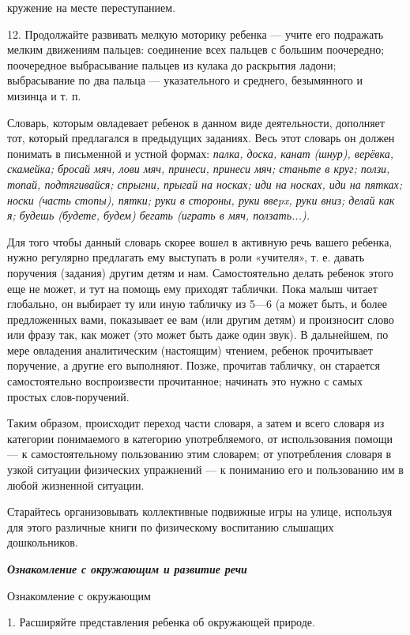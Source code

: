 \documentclass{book}
\renewcommand{\emph}[1]{\textit{#1}}
\begin{document}
кружение на месте переступанием.

12. Продолжайте развивать мелкую моторику ребенка --- учите его
подражать мелким движениям пальцев: соединение всех пальцев с большим
поочередно; поочередное выбрасывание пальцев из кулака до раскрытия
ладони; выбрасывание по два пальца --- указательного и среднего,
безымянного и мизинца и т. п.

Словарь, которым овладевает ребенок в данном виде деятельности,
дополняет тот, который предлагался в предыдущих заданиях. Весь этот
словарь он должен понимать в письменной и устной формах: \emph{палка,
доска, канат (шнур), верёвка, скамейка; бросай мяч, лови мяч, принеси,
принеси мяч; станьте в круг; ползи, топай, подтягивайся; спрыгни, прыгай
на носках; иди на носках, иди на пятках; носки (часть стопы), пятки;
руки в стороны, руки ввеpx, руки вниз; делай как я; будешь (будете,
будем) бегать (играть в мяч, ползать...).}

Для того чтобы данный словарь скорее вошел в активную речь вашего
ребенка, нужно регулярно предлагать ему выступать в роли «учителя», т.
е. давать поручения (задания) другим детям и нам. Самостоятельно делать
ребенок этого еще не может, и тут на помощь ему приходят таблички. Пока
малыш читает глобально, он выбирает ту или иную табличку из 5---6 (а
может быть, и более предложенных вами, показывает ее вам (или другим
детям) и произносит слово или фразу так, как может (это может быть даже
один звук). В дальнейшем, по мере овладения аналитическим (настоящим)
чтением, ребенок прочитывает поручение, а другие его выполняют. Позже,
прочитав табличку, он старается самостоятельно воспроизвести
прочитанное; начинать это нужно с самых простых слов-поручений.

Таким образом, происходит переход части словаря, а затем и всего словаря
из категории понимаемого в категорию употребляемого, от использования
помощи --- к самостоятельному пользованию этим словарем; от употребления
словаря в узкой ситуации физических упражнений --- к пониманию его и
пользованию им в любой жизненной ситуации.

Старайтесь организовывать коллективные подвижные игры на улице,
используя для этого различные книги по физическому воспитанию слышащих
дошкольников.

\emph{\textbf{Ознакомление с окружающим и развитие речи}}

Ознакомление с окружающим

1. Расширяйте представления ребенка об окружающей природе.
\end{document}
